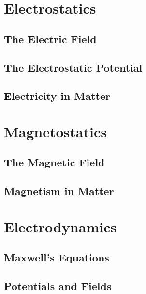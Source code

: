 \documentclass{book}
\theoremstyle{definition}
\theoremstyle{remark}
\begin{document}

\tableofcontents
\part{Electrostatics}
\chapter{The Electric Field}
%

\chapter{The Electrostatic Potential}

\chapter{Electricity in Matter}

\part{Magnetostatics}
\chapter{The Magnetic Field}

\chapter{Magnetism in Matter}

\part{Electrodynamics}
\chapter{Maxwell's Equations}

\chapter{Potentials and Fields}

\end{document}
